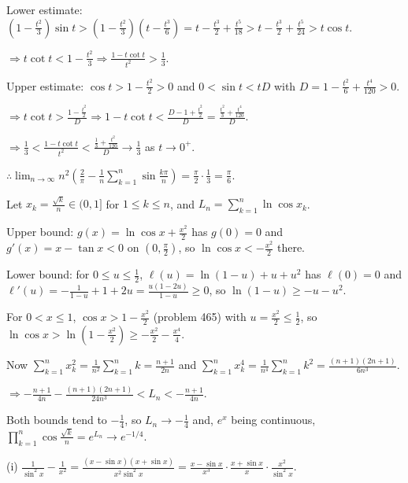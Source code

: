   Lower estimate: $(1 - \frac{t^2}{3})\sin t > \left(1 - \frac{t^2}{3}\right)\left(t - \frac{t^3}{6}\right) = t
  - \frac{t^3}{2} + \frac{t^5}{18} > t - \frac{t^3}{2} + \frac{t^5}{24} > t\cos t$.

  $\Rightarrow t\cot t < 1 - \frac{t^2}{3}\Rightarrow\frac{1 - t\cot t}{t^2} > \frac{1}{3}$.

  Upper estimate: $\cos t > 1 - \frac{t^2}{2} > 0$ and $0 < \sin t < tD$ with $D = 1 - \frac{t^2}{6} +
  \frac{t^4}{120} > 0$.

  $\Rightarrow t\cot t > \frac{1 - \frac{t^2}{2}}{D}\Rightarrow 1 - t\cot t < \frac{D - 1 +
    \frac{t^2}{2}}{D} = \frac{\frac{t^2}{3} + \frac{t^4}{120}}{D}$.

  $\Rightarrow\frac{1}{3} < \frac{1 - t\cot t}{t^2} < \frac{\frac{1}{3} + \frac{t^2}{120}}{D}\to\frac{1}{3}$ as
  $t\to 0^+$.

  $\therefore\displaystyle\lim_{n\to\infty}n^2\left(\frac{2}{\pi} - \frac{1}{n}\sum_{k =
    1}^n\sin\frac{k\pi}{n}\right) = \frac{\pi}{2}\cdot\frac{1}{3} = \frac{\pi}{6}$.
\item Let $x_k = \frac{\sqrt{k}}{n}\in(0, 1]$ for $1\leq k\leq n$, and $L_n = \displaystyle\sum_{k = 1}^n\ln\cos
  x_k$.

  Upper bound: $g(x) = \ln\cos x + \frac{x^2}{2}$ has $g(0) = 0$ and $g'(x) = x - \tan x < 0$ on $\left(0,
    \frac{\pi}{2}\right)$, so $\ln\cos x < -\frac{x^2}{2}$ there.

  Lower bound: for $0\leq u\leq\frac{1}{2}$, $\ell(u) = \ln(1 - u) + u + u^2$ has $\ell(0) = 0$ and
  $\ell'(u) = -\frac{1}{1 - u} + 1 + 2u = \frac{u(1 - 2u)}{1 - u}\geq 0$, so $\ln(1 - u)\geq -u - u^2$.

  For $0 < x\leq 1$, $\cos x > 1 - \frac{x^2}{2}$ (problem 465) with $u = \frac{x^2}{2}\leq\frac{1}{2}$, so
  $\ln\cos x > \ln\left(1 - \frac{x^2}{2}\right)\geq -\frac{x^2}{2} - \frac{x^4}{4}$.

  Now $\displaystyle\sum_{k = 1}^nx_k^2 = \frac{1}{n^2}\sum_{k = 1}^nk = \frac{n + 1}{2n}$ and
  $\displaystyle\sum_{k = 1}^nx_k^4 = \frac{1}{n^4}\sum_{k = 1}^nk^2 = \frac{(n + 1)(2n + 1)}{6n^3}$.

  $\Rightarrow -\frac{n + 1}{4n} - \frac{(n + 1)(2n + 1)}{24n^3} < L_n < -\frac{n + 1}{4n}$.

  Both bounds tend to $-\frac{1}{4}$, so $L_n\to -\frac{1}{4}$ and, $e^x$ being continuous,
  $\displaystyle\prod_{k = 1}^n\cos\frac{\sqrt{k}}{n} = e^{L_n}\to e^{-1/4}$.
\item (i) $\frac{1}{\sin^2x} - \frac{1}{x^2} = \frac{(x - \sin x)(x + \sin x)}{x^2\sin^2x} = \frac{x - \sin
    x}{x^3}\cdot\frac{x + \sin x}{x}\cdot\frac{x^2}{\sin^2x}$.

